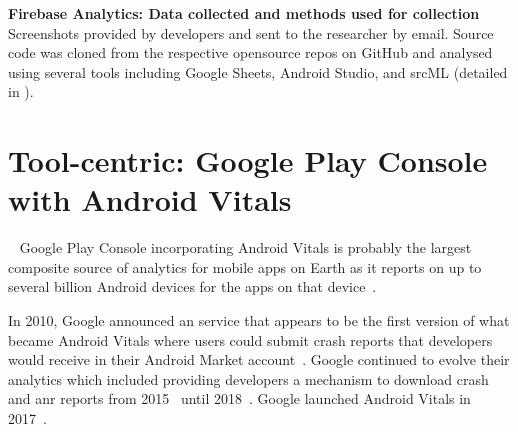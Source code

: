 \textbf{Firebase Analytics: Data collected and methods used for collection}
Screenshots provided by developers and sent to the researcher by email. Source code was cloned from the respective opensource repos on GitHub and analysed using several tools including Google Sheets, Android Studio, and srcML (detailed in ).





\section{Tool-centric: Google Play Console with Android Vitals}~\label{case-study-overview-google-play-console-with-android-vitals}
Google Play Console incorporating Android Vitals is probably the largest composite source of analytics for mobile apps on Earth as it reports on up to several billion Android devices for the apps on that device~.

In 2010, Google announced an service that appears to be the first version of what became Android Vitals where users could submit crash reports that developers would receive in their Android Market account~. Google continued to evolve their analytics which included providing developers a mechanism to download crash and \acrshort{anr} reports from 2015~ until 2018~. Google launched Android Vitals in 2017~.

